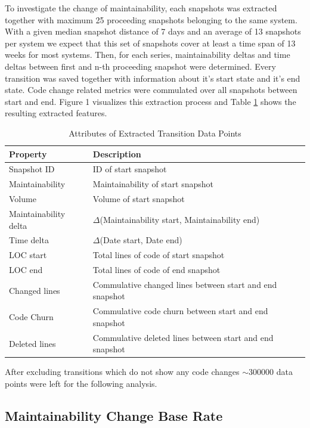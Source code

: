To investigate the change of maintainability, each snapshots was extracted together with maximum 25 proceeding snapshots belonging to the same system. With a given median snapshot distance of 7 days and an average of 13 snapshots per system we expect that this set of snapshots cover at least a time span of 13 weeks for most systems. Then, for each series, maintainability deltas and time deltas between first and n-th proceeding snapshot were determined. Every transition was saved together with information about it's start state and it's end state. Code change related metrics were commulated over all snapshots between start and end. Figure 1 visualizes this extraction process and Table \ref{data_points} shows the resulting extracted features.
\begin{table}[htbp!]
\caption{Attributes of Extracted Transition Data Points}
\begin{tabular}{l  p{5.2cm}}
  \hline			
  Property & Description \\ \hline
  Snapshot ID & ID of start snapshot \\
  Maintainability & Maintainability of start snapshot\\ 
  Volume & Volume of start snapshot\\ 
  Maintainability delta & \(\Delta\)(Maintainability start, Maintainability end)\\
  Time delta & \(\Delta\)(Date start, Date end)\\
  LOC start & Total lines of code of start snapshot\\ 
  LOC end & Total lines of code of end snapshot\\ 
  Changed lines & Commulative changed lines between start and end snapshot \\
  Code Churn & Commulative code churn between start and end snapshot \\ 
  Deleted lines & Commulative deleted lines between start and end snapshot \\ \hline
\end{tabular}
\label{data_points}
\end{table}

After excluding transitions which do not show any code changes $\sim$300000 data points were left for the following analysis.

\subsection{Maintainability Change Base Rate}

